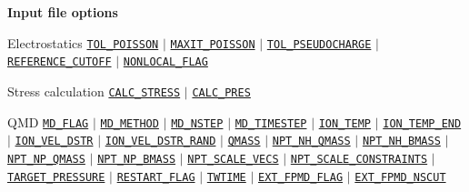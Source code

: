 \begin{frame}[allowframebreaks]{\textbf{Input file options}} \label{Index}
\vspace{-2mm}
\begin{block}{Electrostatics}
\hyperlink{TOL_POISSON}{\texttt{TOL\_POISSON}} $\vert$ 
\hyperlink{MAXIT_POISSON}{\texttt{MAXIT\_POISSON}} $\vert$ 
\hyperlink{TOL_PSEUDOCHARGE}{\texttt{TOL\_PSEUDOCHARGE}} $\vert$ 
\hyperlink{REFERENCE_CUTOFF}{\texttt{REFERENCE\_CUTOFF}} $\vert$ 
\hyperlink{NONLOCAL_FLAG}{\texttt{NONLOCAL\_FLAG}}
\end{block}

\vspace{-2mm}
\begin{block}{Stress calculation}
\hyperlink{CALC_STRESS}{\texttt{CALC\_STRESS}} $\vert$ 
\hyperlink{CALC_PRES}{\texttt{CALC\_PRES}}
\end{block}
\vspace{-2mm}

\begin{block}{QMD}
\hyperlink{MD_FLAG}{\texttt{MD\_FLAG}} $\vert$ 
\hyperlink{MD_METHOD}{\texttt{MD\_METHOD}} $\vert$ 
\hyperlink{MD_NSTEP}{\texttt{MD\_NSTEP}} $\vert$ 
\hyperlink{MD_TIMESTEP}{\texttt{MD\_TIMESTEP}} $\vert$ 
\hyperlink{ION_TEMP}{\texttt{ION\_TEMP}} $\vert$ 
\hyperlink{ION_TEMP_END}{\texttt{ION\_TEMP\_END}} $\vert$ 
\hyperlink{ION_VEL_DSTR}{\texttt{ION\_VEL\_DSTR}} $\vert$ 
\hyperlink{ION_VEL_DSTR_RAND}{\texttt{ION\_VEL\_DSTR\_RAND}} $\vert$ 
\hyperlink{QMASS}{\texttt{QMASS}} $\vert$ 
\hyperlink{NPT_NH_QMASS}{\texttt{NPT\_NH\_QMASS}} $\vert$ 
\hyperlink{NPT_NH_BMASS}{\texttt{NPT\_NH\_BMASS}} $\vert$ 
\hyperlink{NPT_NP_QMASS}{\texttt{NPT\_NP\_QMASS}} $\vert$ 
\hyperlink{NPT_NP_BMASS}{\texttt{NPT\_NP\_BMASS}} $\vert$ 
\hyperlink{NPT_SCALE_VECS}{\texttt{NPT\_SCALE\_VECS}} $\vert$ 
\hyperlink{NPT_SCALE_CONSTRAINTS}{\texttt{NPT\_SCALE\_CONSTRAINTS}} $\vert$ 
\hyperlink{TARGET_PRESSURE}{\texttt{TARGET\_PRESSURE}} $\vert$ 
\hyperlink{RESTART_FLAG}{\texttt{RESTART\_FLAG}} $\vert$ 
\hyperlink{TWTIME}{\texttt{TWTIME}} $\vert$ 
\hyperlink{EXT_FPMD_FLAG}{\texttt{EXT\_FPMD\_FLAG}} $\vert$ 
\hyperlink{EXT_FPMD_NSCUT}{\texttt{EXT\_FPMD\_NSCUT}}
\end{block}
\vspace{-2mm}


\end{frame}
